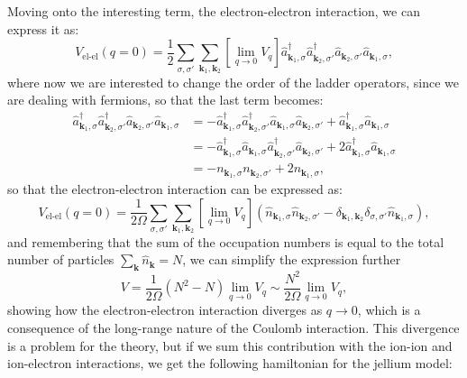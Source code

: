 Moving onto the interesting term, the electron-electron interaction, we can express it as:
\[
    V_{\text{el-el}} (q=0) = \frac{1}{2} \sum_{\sigma, \sigma'} \sum_{\mathbf{k}_1, \mathbf{k}_2} \left[ \lim_{q \to 0} V_q \right] \hat{a}_{\mathbf{k}_1, \sigma}^\dagger \hat{a}_{\mathbf{k}_2, \sigma'}^\dagger \hat{a}_{\mathbf{k}_2, \sigma'} \hat{a}_{\mathbf{k}_1, \sigma},
\]
where now we are interested to change the order of the ladder operators, since we are dealing with fermions, so that the last term becomes:
\[
    \begin{aligned}
        \hat{a}_{\mathbf{k}_1, \sigma}^\dagger \hat{a}_{\mathbf{k}_2, \sigma'}^\dagger \hat{a}_{\mathbf{k}_2, \sigma'} \hat{a}_{\mathbf{k}_1, \sigma} & = -\hat{a}_{\mathbf{k}_1, \sigma}^\dagger \hat{a}_{\mathbf{k}_2, \sigma'}^\dagger \hat{a}_{\mathbf{k}_1, \sigma} \hat{a}_{\mathbf{k}_2, \sigma'} + \hat{a}_{\mathbf{k}_1, \sigma}^\dagger \hat{a}_{\mathbf{k}_1, \sigma}  \\
                                                                                                                                                      & = -\hat{a}_{\mathbf{k}_1, \sigma}^\dagger \hat{a}_{\mathbf{k}_1, \sigma} \hat{a}_{\mathbf{k}_2, \sigma'}^\dagger \hat{a}_{\mathbf{k}_2, \sigma'} + 2\hat{a}_{\mathbf{k}_1, \sigma}^\dagger \hat{a}_{\mathbf{k}_1, \sigma} \\
                                                                                                                                                      & = -n_{\mathbf{k}_1, \sigma} n_{\mathbf{k}_2, \sigma'} + 2 n_{\mathbf{k}_1, \sigma},
    \end{aligned}
\]
so that the electron-electron interaction can be expressed as:
\[
    V_{\text{el-el}}(q=0) = \frac{1}{2\Omega} \sum_{\sigma, \sigma'} \sum_{\mathbf{k}_1, \mathbf{k}_2} \left[ \lim_{q \to 0} V_q \right] (\hat{n}_{\mathbf{k}_1, \sigma} \hat{n}_{\mathbf{k}_2, \sigma'} - \delta_{\mathbf{k}_1, \mathbf{k}_2} \delta_{\sigma, \sigma'} \hat{n}_{\mathbf{k}_1, \sigma}),
\]
and remembering that the sum of the occupation numbers is equal to the total number of particles \(\sum_{\mathbf{k}} \hat{n}_{\mathbf{k}} = N\), we can simplify the expression further
\[
    V = \frac{1}{2\Omega} (N^2 - N) \lim_{q \to 0} V_q \sim \frac{N^2}{2\Omega} \lim_{q \to 0} V_q,
\]
showing how the electron-electron interaction diverges as \(q \to 0\), which is a consequence of the long-range nature of the Coulomb interaction. This divergence is a problem for the theory, but if we sum this contribution with the ion-ion and ion-electron interactions, we get the following hamiltonian for the jellium model:
